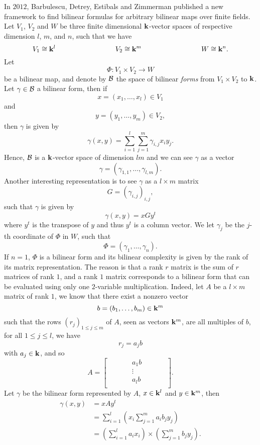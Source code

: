 In $2012$, Barbulescu, Detrey, Estibals and Zimmerman published a new framework
to find bilinear formulas for arbitrary bilinear maps over finite fields. Let
$V_1$, $V_2$ and $W$ be three finite dimensional $\mathbf{k}$-vector spaces of respective
dimension $l$, $m$, and $n$, such that we have
\[
  V_1\cong\K^l\hspace{3cm}V_2\cong\K^m\hspace{3cm}W\cong\K^n.
\]
Let
\[
  \Phi:V_1\times V_2\to W
\]
be a bilinear map, and denote by $\mathcal{B}$ the space of bilinear \emph{forms} from
$V_1\times V_2$ to $\mathbf{k}$. Let $\gamma\in\mathcal{B}$ a bilinear form, then if
\[
  x = (x_1, \dots, x_l)\in V_1
\]
and
\[
  y = (y_1, \dots, y_m)\in V_2,
\]
then $\gamma$ is given by
\[
  \gamma(x, y) = \sum_{i=1}^{l}\sum_{j=1}^m \gamma_{i, j} x_i y_j.
\]
Hence, $\mathcal{B}$ is a $\mathbf{k}$-vector space of dimension $lm$ and we can see $\gamma$ as
a vector
\[
  \gamma = (\gamma_{1, 1}, \dots, \gamma_{l, m}).
\]
Another interesting representation is to see $\gamma$ as a $l\times m$ matrix
\[
  G = (\gamma_{i, j})_{i, j},
\]
such that $\gamma$ is given by
\[
  \gamma(x, y) = x G y^t
\]
where $y^t$ is the transpose of $y$ and thus $y^t$ is a column vector. We let
$\gamma_j$ be the $j$-th coordinate of $\Phi$ in $W$, such that
\[
  \Phi = (\gamma_1, \dots, \gamma_n).
\]
If $n=1$, $\Phi$ is a bilinear form and its bilinear complexity is given by the
rank of its matrix representation. The reason is that a rank $r$ matrix is the sum of $r$ matrices of rank $1$,
and a rank $1$ matrix corresponds to a bilinear form that can be evaluated using
only one $2$-variable multiplication. Indeed, let $A$ be a $l\times m$ matrix of rank $1$, we know that
there exist a nonzero vector 
\[
  b=(b_1, \dots, b_m)\in\mathbf{k}^m
\]
such that the rows $(r_j)_{1\leq j \leq m}$ of $A$, seen as vectors $\mathbf{k}^m$, are
all multiples of $b$, \ie for all $1\leq j \leq l$, we have
\[
  r_j = a_j b
\]
with $a_j\in\mathbf{k}$, and so
\[
  A =
\begin{bmatrix}
  & & & & a_1 b & & & & \\
  & & & & \vdots & & & & \\
  & & & & a_l b & & & & \\
\end{bmatrix}.
\]
Let $\gamma$ be the bilinear form represented by $A$, $x\in\mathbf{k}^l$ and $y\in\mathbf{k}^m$, then
\begin{align*}
  \gamma(x, y) &= x A y^t \\
  &= \sum_{i=1}^{l}(x_i \sum_{j=1}^m a_i b_j y_j) \\
  &= (\sum_{i=1}^l a_i x_i)\times(\sum_{j=1}^m b_j y_j).
\end{align*}
